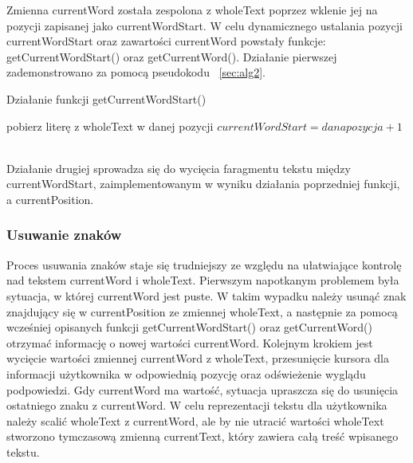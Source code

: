 \documentclass[twoside,a4paper]{book}
\begin{document}
Zmienna currentWord została zespolona z wholeText poprzez wklenie jej na pozycji zapisanej jako currentWordStart. 
W celu dynamicznego ustalania pozycji currentWordStart oraz zawartości currentWord powstały funkcje: getCurrentWordStart() oraz getCurrentWord(). Działanie pierwszej zademonstrowano za pomocą pseudokodu ~\ref{sec:alg2}.
\begin{algorithm}
\caption{Działanie funkcji getCurrentWordStart()}
\label{sec:alg2}
\begin{algorithmic}
\STATE pobierz literę z wholeText w danej pozycji
\STATE $currentWordStart = dana pozycja + 1$
\ENDIF
\ENDFOR
\ENDIF
\end{algorithmic}
\end{algorithm}\\
Działanie drugiej sprowadza się do wycięcia faragmentu tekstu między currentWordStart, zaimplementowanym w wyniku działania poprzedniej funkcji, a currentPosition.
\subsubsection{Usuwanie znaków} \label{sec:backspc}
Proces usuwania znaków staje się trudniejszy ze względu na ułatwiające kontrolę nad tekstem currentWord i wholeText. Pier\-wszym napotkanym problemem była sytuacja, w której currentWord jest puste. W takim wypadku należy usunąć znak znajdujący się w currentPosition ze zmie\-nnej wholeText, a następnie za pomocą wcześniej opisanych funkcji getCurrentWordStart() oraz getCurrentWord() otrzymać informację o nowej wartości currentWord. Kolejnym krokiem jest wycięcie wartości zmiennej currentWord z wholeText, przesunięcie kursora dla informacji użytkownika w odpowiednią pozycję oraz odświeżenie wyglądu podpowiedzi.
Gdy currentWord ma wartość, sytuacja upraszcza się do usunięcia ostatniego znaku z currentWord. W celu reprezentacji tekstu dla użytkownika należy scalić wholeText z currentWord, ale by nie utracić wartości wholeText stworzono tymczasową zmienną currentText, który zawiera całą treść wpisanego tekstu.
\end{document}
